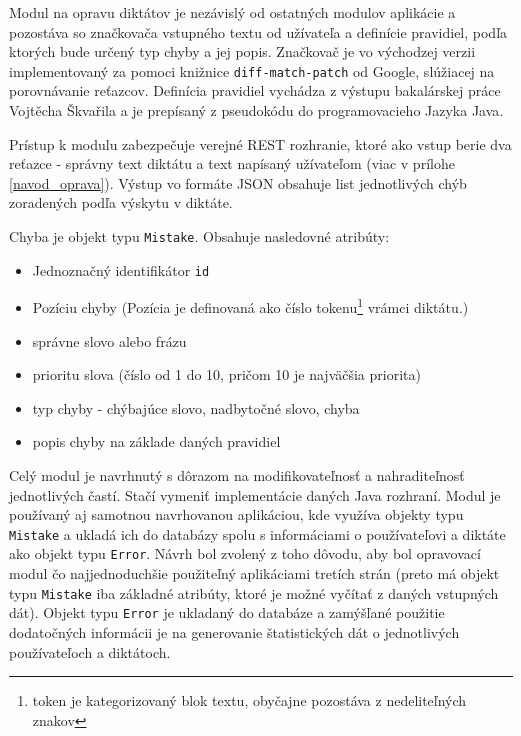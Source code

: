 \documentclass[12pt,oneside]{fithesis2}
\begin{document}
      \par Modul na opravu diktátov je nezávislý od ostatných modulov aplikácie a pozostáva so značkovača vstupného textu od užívateľa a definície pravidiel, podľa ktorých bude určený typ chyby a jej popis. Značkovač je vo východzej verzii implementovaný za pomoci knižnice \texttt{diff-match-patch} od Google\cite{diffmatchpatch}, slúžiacej na porovnávanie reťazcov. Definícia pravidiel vychádza z výstupu bakalárskej práce Vojtěcha Škvařila \cite{skvaril14} a je prepísaný z pseudokódu do programovacieho Jazyka Java.
      \par Prístup k modulu zabezpečuje verejné REST rozhranie, ktoré ako vstup berie dva reťazce - správny text diktátu a text napísaný užívateľom (viac v prílohe \ref{navod_oprava}). Výstup vo formáte JSON obsahuje list jednotlivých chýb zoradených podľa výskytu v diktáte.
      
	  \par Chyba je objekt typu \texttt{Mistake}. Obsahuje nasledovné atribúty: 
\begin{itemize}
	\item Jednoznačný identifikátor \texttt{id}
	\item Pozíciu chyby (Pozícia je definovaná ako číslo tokenu\footnote{token je kategorizovaný blok textu, obyčajne pozostáva z nedeliteľných znakov} vrámci diktátu.)
	\item správne slovo alebo frázu
	\item prioritu slova (číslo od 1 do 10, pričom 10 je najväčšia priorita)
	\item typ chyby - chýbajúce slovo, nadbytočné slovo, chyba
	\item popis chyby na základe daných pravidiel
\end{itemize}
	
      \par Celý modul je navrhnutý s dôrazom na modifikovateľnosť a nahraditeľnosť jednotlivých častí. Stačí vymeniť implementácie daných Java rozhraní. Modul je používaný aj samotnou navrhovanou aplikáciou, kde využíva objekty typu \texttt{Mistake} a ukladá ich do databázy spolu s informáciami o používateľovi a diktáte ako objekt typu \texttt{Error}. Návrh bol zvolený z toho dôvodu, aby bol opravovací modul čo najjednoduchšie použiteľný aplikáciami tretích strán (preto má objekt typu \texttt{Mistake} iba základné atribúty, ktoré je možné vyčítať z daných vstupných dát). Objekt typu \texttt{Error} je ukladaný do databáze a zamýšľané použitie dodatočných informácii je na generovanie štatistických dát o jednotlivých používateľoch a diktátoch.
\end{document}
